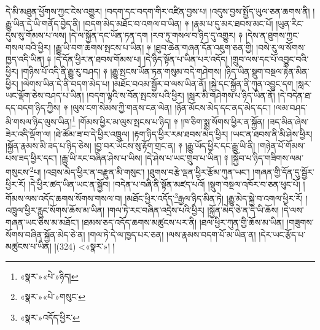 དེ་མི་མཐུན་ཕྱོགས་ཀྱང་ངེས་འགྱུར། །བདག་དང་བདག་གིར་འཛིན་བྱས་པ། །འདུས་བྱས་སྤྱོད་ཡུལ་ཅན་ཆགས་ནི། །རྒྱུ་ཡིན་དེ་ཡི་གནོད་བྱེད་ནི། །བདག་མེད་མཐོང་བ་འགལ་བ་ཡིན། ༈ །རྣམ་པ་དུ་མར་ཐབས་མང་པོ། །ཡུན་རིང་དུས་སུ་གོམས་པ་ལས། །དེ་ལ་སྐྱོན་དང་ཡོན་ཏན་དག །རབ་ཏུ་གསལ་བ་ཉིད་དུ་འགྱུར། ༈ །དེས་ན་ཐུགས་ཀྱང་གསལ་བའི་ཕྱིར། །རྒྱུ་ཡི་བག་ཆགས་སྤངས་པ་ཡིན། ༈ །ཐུབ་ཆེན་གཞན་དོན་འཇུག་ཅན་གྱི། །བསེ་རུ་ལ་སོགས་ཁྱད་འདི་ཡིན། ༈ །དེ་དོན་ཕྱིར་ན་ཐབས་གོམས་པ། །དེ་ཉིད་སྟོན་པ་ཡིན་པར་འདོད། །གྲུབ་ལས་དང་པོ་འབྱུང་བའི་ཕྱིར། །གཉིས་པོ་འདི་ནི་རྒྱུ་རུ་བཤད། ༈ །རྒྱུ་སྤངས་ཡོན་ཏན་གསུམ་བདེ་གཤེགས། །ཉིད་ཡིན་སྡུག་བསྔལ་རྟེན་མིན་ཕྱིར། །ལེགས་ཡིན་དེ་ནི་བདག་མེད་པ། །མཐོང་བའམ་སྦྱོར་བ་ལས་ཡིན་ནོ། །སྐྱེ་དང་སྐྱོན་ནི་ཀུན་འབྱུང་དག །སླར་ཡང་ལྡོག་ཅེས་བཤད་པ་ཡིན། །བདག་ལྟའི་ས་བོན་སྤངས་པའི་ཕྱིར། །སླར་མི་གཤེགས་པ་ཉིད་ཡིན་ནོ། །དེ་བདེན་ཐ་དད་བདག་ཉིད་ཀྱིས། ༈ །ལུས་ངག་སེམས་ཀྱི་གནས་ངན་ལེན། །ཉོན་མོངས་མེད་དང་ནད་མེད་དང་། །ལམ་བཤད་མི་གསལ་ཉིད་ལུས་ཡིན།\footnote{«སྣར་»«པེ་»ཉིད།} །གོམས་ཕྱིར་མ་ལུས་སྤངས་པ་ཉིད། ༈ །ཁ་ཅིག་སྨྲ་སོགས་ཕྱིར་ན་སྐྱོན། །ཟད་མིན་ཞེས་ཟེར་འདི་ལྡོག་ལ། །ཐེ་ཚོམ་ཟ་བ་དེ་ཕྱིར་འཁྲུལ། །རྟག་ཉིད་ཕྱིར་རམ་ཐབས་མེད་ཕྱིར། །ཡང་ན་ཐབས་ནི་མི་ཤེས་ཕྱིར། །སྐྱོན་རྣམས་མི་ཟད་པ་ཉིད་ཅེས། །བྱ་བར་ཡོངས་སུ་རྟོག་གྲང་ན། ༈ །རྒྱུ་ཡོད་ཕྱིར་དང་རྒྱུ་ཡི་ནི། །གཉེན་པོ་གོམས་པས་ཟད་ཕྱིར་དང་། །རྒྱུ་ཡི་རང་བཞིན་ཤེས་པ་ཡིས། །དེ་ཤེས་པ་ཡང་གྲུབ་པ་ཡིན། ༈ །སྐྱོབ་པ་ཉིད་གཟིགས་ལམ་གསུངས་\footnote{«སྣར་»«པེ་»གསུང་}པ། །འབྲས་མེད་ཕྱིར་ན་བརྫུན་མི་གསུང་། །ཐུགས་བརྩེ་ལྡན་ཕྱིར་རྩོམ་ཀུན་ཡང་། །གཞན་གྱི་དོན་དུ་སྦྱོར་ཕྱིར་རོ། །དེ་ཕྱིར་ཚད་ཡིན་ཡང་ན་སྐྱོབ། །བདེན་པ་བཞི་ནི་སྟོན་མཛད་པའོ། །སྡུག་བསྔལ་འཁོར་བ་ཅན་ཕུང་པོ། །གོམས་ལས་འདོད་ཆགས་སོགས་གསལ་བ། །མཐོང་ཕྱིར་འདོད་\footnote{«སྣར་»འདོད་ཕྱིར་}རྒྱལ་ཉིད་མིན་ཏེ། །རྒྱུ་མེད་སྐྱེ་བ་འགལ་ཕྱིར་རོ། །འཁྲུལ་ཕྱིར་རླུང་སོགས་ཆོས་མ་ཡིན། །གལ་ཏེ་རང་བཞིན་འདྲེས་པའི་ཕྱིར། །སྐྱོན་མེད་ཅེ་ན་དེ་ཡི་ཆོས། །དེ་ལས་གཞན་ཡང་ཅིས་མ་མཐོང་། །ཐམས་ཅད་འདོད་ཆགས་མཚུངས་པར་ནི། །ཐལ་ཕྱིར་ཀུན་གྱི་ཆོས་མ་ཡིན། །གཟུགས་སོགས་བཞིན་སྐྱོན་མེད་ཅེ་ན། །གལ་ཏེ་དེ་ལ་ཁྱད་པར་ཅན། །ལས་རྣམས་བདག་པོ་མ་ཡིན་ན། །དེར་ཡང་རྩོད་པ་མཚུངས་པ་ཡིན། །(324) <«སྣར་»། །
